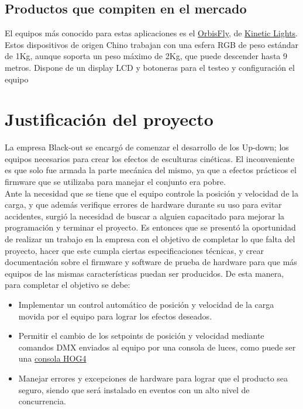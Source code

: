 \subsection{Productos que compiten en el mercado}
El equipos más conocido para estas aplicaciones es el \href{http://www.eastsunlite.com/p31.html}{OrbisFly}, de \href{https://www.kinetic-lights.com/}{Kinetic Lights}. Estos dispositivos de origen Chino trabajan con una esfera RGB de peso estándar de 1Kg, aunque soporta un peso máximo de 2Kg, que puede descender hasta 9 metros. Dispone de un display LCD y botoneras para el testeo y configuración el equipo\\




\newpage
\section{Justificación del proyecto}
La empresa Black-out se encargó de comenzar el desarrollo de los Up-down; los equipos necesarios para crear los efectos de esculturas cinéticas. El inconveniente es que solo fue armada la parte mecánica del mismo, ya que a efectos prácticos el firmware que se utilizaba para manejar el conjunto era pobre.\\
Ante la necesidad que se tiene que el equipo controle la posición y velocidad de la carga, y que además verifique errores de hardware durante su uso para evitar accidentes, surgió la necesidad de buscar a alguien capacitado para mejorar la programación y terminar el proyecto.
Es entonces que se presentó la oportunidad de realizar un trabajo en la empresa con el objetivo de completar lo que falta del proyecto, hacer que este cumpla ciertas especificaciones técnicas, y crear documentación sobre el firmware y software de prueba de hardware para que más equipos de las mismas características puedan ser producidos. De esta manera, para completar el objetivo se debe:
\begin{itemize}
	\item Implementar un control automático de posición y velocidad de la carga movida por el equipo para lograr los efectos deseados.
	\item Permitir el cambio de los setpoints de posición y velocidad mediante comandos DMX enviados al equipo por una consola de luces, como puede ser una \href{https://www2.highend.com/products/controllers/Hog4Console.asp}{consola HOG4}
	\item Manejar errores y excepciones de hardware para lograr que el producto sea seguro, siendo que será instalado en eventos con un alto nivel de concurrencia.
\end{itemize}




